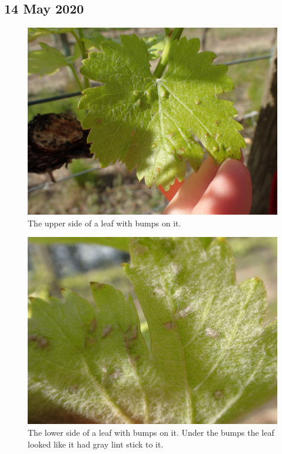 \documentclass[11pt,letter]{article}
\begin{document}
\subsection{14 May 2020}
\begin{figure}%
  \includegraphics[width=\linewidth]{UpperLumpsFaith.jpg}
  \caption{The upper side of a leaf with bumps on it. }
  \label{fig:upperlumpsFaith}
\end{figure}
\begin{figure}%
  \includegraphics[width=\linewidth]{LowerLumpsFaith.jpg}
  \caption{The lower side of a leaf with bumps on it. Under the bumps the leaf looked like it had gray lint stick to it. }
  \label{fig:lowerLunpsFaith }
\end{figure} 
\end{document}
